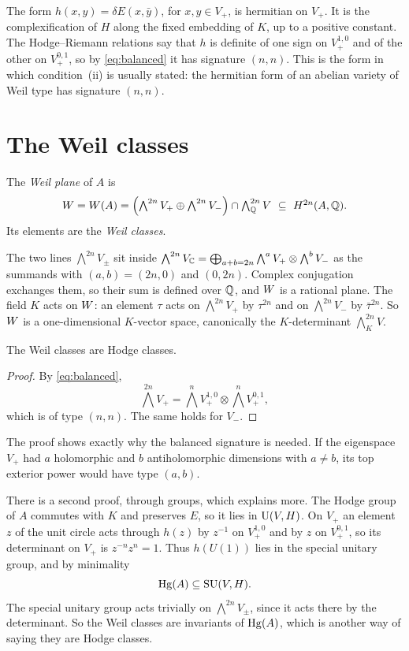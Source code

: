 The form $h(x,y)=\delta E(x,\bar y)$, for $x,y\in V_{+}$, is hermitian on
$V_{+}$. It is the complexification of $H$ along the fixed embedding of
$K$, up to a positive constant. The Hodge--Riemann relations say that
$h$ is definite of one sign on $V_{+}^{1,0}$ and of the other on
$V_{+}^{0,1}$, so by \eqref{eq:balanced} it has signature $(n,n)$. This
is the form in which condition~(ii) is usually stated: the hermitian form
of an abelian variety of Weil type has signature $(n,n)$.

\section{The Weil classes}

\begin{definition}
The \emph{Weil plane} of $A$ is
\[
  \HW=\HW(A)=\Bigl(\textstyle\bigwedge^{2n}V_{+}\oplus\bigwedge^{2n}V_{-}\Bigr)
  \cap\textstyle\bigwedge^{2n}_{\QQ}V\ \subseteq\ H^{2n}(A,\QQ).
\]
Its elements are the \emph{Weil classes}.
\end{definition}

The two lines $\bigwedge^{2n}V_{\pm}$ sit inside
$\bigwedge^{2n}V_{\mathbb{C}}=\bigoplus_{a+b=2n}\bigwedge^{a}V_{+}\otimes
\bigwedge^{b}V_{-}$ as the summands with $(a,b)=(2n,0)$ and $(0,2n)$.
Complex conjugation exchanges them, so their sum is defined over $\mathbb{Q}$, and
$W$ is a rational plane. The field $K$ acts on $W$: an element $\tau$
acts on $\bigwedge^{2n}V_{+}$ by $\tau^{2n}$ and on $\bigwedge^{2n}V_{-}$ by
$\bar\tau^{2n}$. So $W$ is a one-dimensional $K$-vector space, canonically
the $K$-determinant $\bigwedge^{2n}_{K}V$.

\begin{theorem}[Weil]\label{thm:weilhodge}
The Weil classes are Hodge classes.
\end{theorem}

\begin{proof}
By \eqref{eq:balanced},
\[
  \textstyle\bigwedge^{2n}V_{+}=\bigwedge^{n}V_{+}^{1,0}\otimes
  \bigwedge^{n}V_{+}^{0,1},
\]
which is of type $(n,n)$. The same holds for $V_{-}$.
\end{proof}

The proof shows exactly why the balanced signature is needed. If the
eigenspace $V_{+}$ had $a$ holomorphic and $b$ antiholomorphic dimensions
with $a\ne b$, its top exterior power would have type $(a,b)$.

There is a second proof, through groups, which explains more. The Hodge
group of $A$ commutes with $K$ and preserves $E$, so it lies in
$\operatorname{U}(V,H)$. On $V_{+}$ an element $z$ of the unit circle acts through
$h(z)$ by $z^{-1}$ on $V_{+}^{1,0}$ and by $z$ on $V_{+}^{0,1}$, so its
determinant on $V_{+}$ is $z^{-n}z^{n}=1$. Thus $h(U(1))$ lies in the
special unitary group, and by minimality
\begin{equation}\label{eq:hginsu}
  \operatorname{Hg}(A)\subseteq\operatorname{SU}(V,H).
\end{equation}
The special unitary group acts trivially on $\bigwedge^{2n}V_{\pm}$,
since it acts there by the determinant. So the Weil classes are
invariants of $\operatorname{Hg}(A)$, which is another way of saying they are Hodge
classes.

